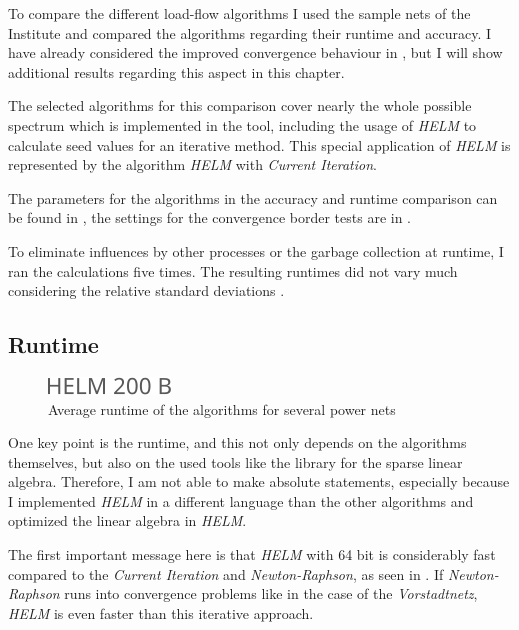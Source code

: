 To compare the different load-flow algorithms I used the sample nets of the Institute and compared the algorithms regarding their runtime and accuracy. I have already considered the improved convergence behaviour in , but I will show additional results regarding this aspect in this chapter.

The selected algorithms for this comparison cover nearly the whole possible spectrum which is implemented in the tool, including the usage of \emph{HELM} to calculate seed values for an iterative method. This special application of \emph{HELM} is represented by the algorithm \emph{HELM} with \emph{Current Iteration}.

The parameters for the algorithms in the accuracy and runtime comparison can be found in , the settings for the convergence border tests are in .

To eliminate influences by other processes or the garbage collection at runtime, I ran the calculations five times. The resulting runtimes did not vary much considering the relative standard deviations .

\subsection{Runtime}

\begin{figure}
	\centering
	\includegraphics[scale=0.7]{figures/comparison_runtime}
	\caption[Comparison, average runtime]{Average runtime of the algorithms for several power nets}
	\label{fig:comparison_runtime}
\end{figure}

One key point is the runtime, and this not only depends on the algorithms themselves, but also on the used tools like the library for the sparse linear algebra. Therefore, I am not able to make absolute statements, especially because I implemented \emph{HELM} in a different language than the other algorithms and optimized the linear algebra in \emph{HELM}.

The first important message here is that \emph{HELM} with 64 bit is considerably fast compared to the \emph{Current Iteration} and \emph{Newton-Raphson}, as seen in . If \emph{Newton-Raphson} runs into convergence problems like in the case of the \emph{Vorstadtnetz}, \emph{HELM} is even faster than this iterative approach. 

